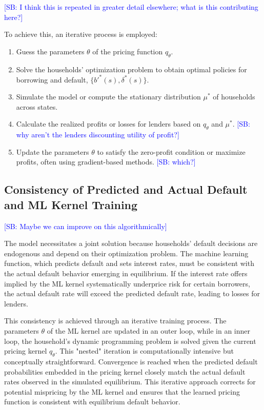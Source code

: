 \documentclass[acmsmall]{acmart}
\newcommand{\spb}[1]{\textcolor{blue}{[SB: #1]}}
\begin{document}
\spb{I think this is repeated in greater detail elsewhere; what is this contributing here?}

To achieve this, an iterative process is employed:
\begin{enumerate}
    \item Guess the parameters $\theta$ of the pricing function $q_\theta$.
    \item Solve the households’ optimization problem to obtain optimal policies for borrowing and default, $\{b'^*(s), \delta^*(s)\}$.
    \item Simulate the model or compute the stationary distribution $\mu^*$ of households across states.
    \item Calculate the realized profits or losses for lenders based on $q_\theta$ and $\mu^*$. \spb{why aren't the lenders discounting utility of profit?}
    \item Update the parameters $\theta$ to satisfy the zero-profit condition or maximize profits, often using gradient-based methods. \spb{which?}
\end{enumerate}

\subsection*{Consistency of Predicted and Actual Default and ML Kernel Training}

\spb{Maybe we can improve on this algorithmically}

The model necessitates a joint solution because households' default decisions are endogenous and depend on their optimization problem. The machine learning function, which predicts default and sets interest rates, must be consistent with the actual default behavior emerging in equilibrium.  If the interest rate offers implied by the ML kernel systematically underprice risk for certain borrowers, the actual default rate will exceed the predicted default rate, leading to losses for lenders.

This consistency is achieved through an iterative training process. The parameters $\theta$ of the ML kernel are updated in an outer loop, while in an inner loop, the household's dynamic programming problem is solved given the current pricing kernel $q_{\theta}$. This "nested" iteration is computationally intensive but conceptually straightforward. Convergence is reached when the predicted default probabilities embedded in the pricing kernel closely match the actual default rates observed in the simulated equilibrium. This iterative approach corrects for potential mispricing by the ML kernel and ensures that the learned pricing function is consistent with equilibrium default behavior.
\end{document}

